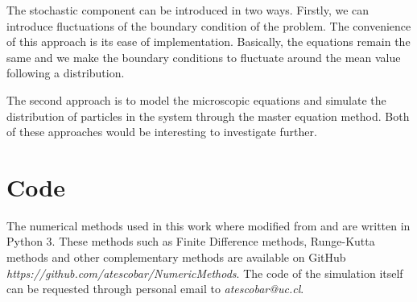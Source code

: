 The stochastic component can be introduced in two ways. Firstly, we can introduce fluctuations of the boundary condition of the problem. The convenience of this approach is its ease of implementation. Basically, the equations remain the same and we make the boundary conditions to fluctuate around the mean value following a distribution. 

The second approach is to model the microscopic equations and simulate the distribution of particles in the system through the master equation method. Both of these approaches would be interesting to investigate further.


\section{Code}

The numerical methods used in this work where modified from \cite{kiusalaas} and are written in Python 3. These methods such as Finite Difference methods, Runge-Kutta methods and other complementary methods are available on GitHub \textit{https://github.com/atescobar/NumericMethods}. The code of the simulation itself can be requested through personal email to \textit{atescobar@uc.cl}.

